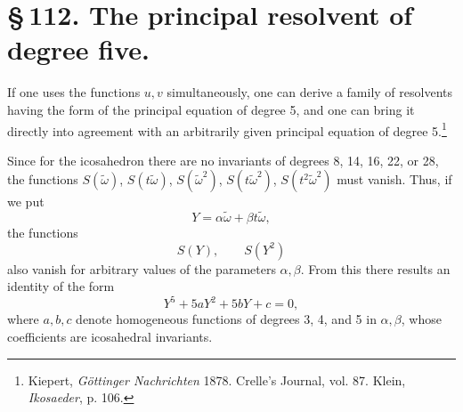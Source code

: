 \documentclass[11pt]{article}
\begin{document}
\section*{\S\,112. The principal resolvent of degree five.}

If one uses the functions \(u,v\) simultaneously, one can derive a family of resolvents having the form of the principal equation of degree 5, and one can bring it directly into agreement with an arbitrarily given principal equation of degree 5.\footnote{Kiepert, \emph{Göttinger Nachrichten} 1878. Crelle's Journal, vol. 87. Klein, \emph{Ikosaeder}, p. 106.}

Since for the icosahedron there are no invariants of degrees 8, 14, 16, 22, or 28, the functions \(S(\tilde\omega)\), \(S(t\tilde\omega)\), \(S(\tilde\omega^2)\), \(S(t\tilde\omega^2)\), \(S(t^2\tilde\omega^2)\) must vanish. Thus, if we put
\begin{equation}
Y=\alpha\tilde\omega+\beta t\tilde\omega,
\tag{1}
\end{equation}
the functions
\[
S(Y),\qquad S(Y^2)
\]
also vanish for arbitrary values of the parameters \(\alpha,\beta\). From this there results an identity of the form
\begin{equation}
Y^5+5aY^2+5bY+c=0,
\tag{2}
\end{equation}
where \(a,b,c\) denote homogeneous functions of degrees 3, 4, and 5 in \(\alpha,\beta\), whose coefficients are icosahedral invariants.
\end{document}
